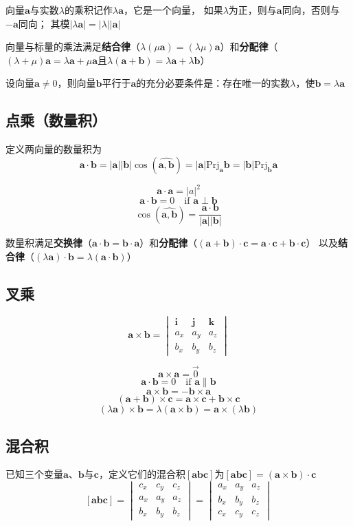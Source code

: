 \documentclass[UTF8]{ctexart}
\newcommand{\cross}{\times}
\newcommand{\ve}[1]{{\bm{#1}}}
\newcommand{\ang}[2]{{(\widehat{\ve{#1},\ve{#2}})}}
\begin{document}
向量$\ve{a}$与实数$\lambda$的乘积记作$\lambda\ve{a}$，它是一个向量，
如果$\lambda$为正，则与$\ve{a}$同向，否则与$-\ve{a}$同向；
其模$|\lambda\ve{a}|=|\lambda||\ve{a}|$

向量与标量的乘法满足{\bf 结合律}（$\lambda(\mu\ve{a})=(\lambda\mu)\ve{a}$）和{\bf 分配律}（$(\lambda+\mu)\ve{a}=\lambda\ve{a}+\mu\ve{a}$且$\lambda(\ve{a}+\ve{b})=\lambda\ve{a}+\lambda\ve{b}$）

\bigskip

设向量$\ve{a}\ne0$，则向量$\ve{b}$平行于$\ve{a}$的充分必要条件是：存在唯一的实数$\lambda$，使$\ve{b}=\lambda\ve{a}$

\subsection*{点乘（数量积）}

定义两向量的数量积为
\[\ve{a}\cdot\ve{b}=|\ve{a}||\ve{b}|\cos\ang{a}{b}=|\ve{a}|\text{Prj}_{\ve{a}} \ve{b}=|\ve{b}|\text{Prj}_{\ve{b}}\ve{a}\]

\[\ve{a}\cdot\ve{a}=|a|^2\]
\[\ve{a}\cdot\ve{b}=0\quad \text{if }\ve{a}\perp\ve{b}\]
\[\cos\ang{a}{b}=\frac{\ve{a}\cdot\ve{b}}{|\ve{a}||\ve{b}|}\]

数量积满足{\bf 交换律}（$\ve{a}\cdot\ve{b}=\ve{b}\cdot\ve{a}$）和{\bf 分配律}（$(\ve{a}+\ve{b})\cdot\ve{c}=\ve{a}\cdot\ve{c}+\ve{b}\cdot\ve{c}$）
以及{\bf 结合律}（$(\lambda\ve{a})\cdot\ve{b}=\lambda(\ve{a}\cdot\ve{b})$）

\subsection*{叉乘}
\[\ve{a}\times\ve{b}=\begin{vmatrix} \ve{i}&\ve{j}&\ve{k}\\a_x&a_y&a_z\\b_x&b_y&b_z\end{vmatrix}\]

\[\ve{a}\cross\ve{a}=\vec{0}\]
\[\ve{a}\cdot\ve{b}=0\quad \text{if }\ve{a}\parallel\ve{b}\]
\[\ve{a}\cross\ve{b}=-\ve{b}\cross\ve{a}\]
\[(\ve{a}+\ve{b})\cross\ve{c}=\ve{a}\cross\ve{c}+\ve{b}\cross\ve{c}\]
\[(\lambda\ve{a})\cross\ve{b}=\lambda(\ve{a}\cross\ve{b})=\ve{a}\cross(\lambda\ve{b})\]

\subsection*{混合积}
已知三个变量$\ve{a}$、$\ve{b}$与$\ve{c}$，定义它们的混合积$[\ve{a}\ve{b}\ve{c}]$为$[\ve{a}\ve{b}\ve{c}]=(\ve{a}\cross\ve{b})\cdot\ve{c}$
\[[\ve{a}\ve{b}\ve{c}]=\begin{vmatrix} c_x&c_y&c_z\\a_x&a_y&a_z\\b_x&b_y&b_z\end{vmatrix}=\begin{vmatrix} a_x&a_y&a_z\\b_x&b_y&b_z\\c_x&c_y&c_z\end{vmatrix}\]
\end{document}
